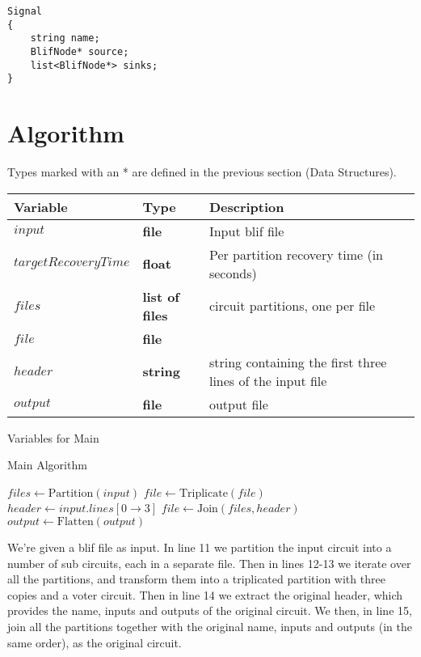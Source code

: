 \documentclass[12pt,draft,oneside]{article} %
\begin{document}
\begin{lstlisting}
Signal
{
    string name;
    BlifNode* source;
    list<BlifNode*> sinks;
}
\end{lstlisting}


\newpage
\section{Algorithm}
Types marked with an * are defined in the previous section (Data Structures).
\begin{algorithm}
    \begin{center}
        \begin{tabular}{lll}
        \toprule
        Variable & Type & Description\\
        \midrule
        $input$ & \bf{file} & Input blif file\\
        $targetRecoveryTime$ & \bf{float} & Per partition recovery time (in seconds) \\
        $files$ & \bf{list} of \bf{file}s & circuit partitions, one per file \\
        $file$ & \bf{file} & \\
        $header$ & \bf{string} & string containing the first three lines of the input file \\
        $output$ & \bf{file} & output file\\
        \bottomrule
        \end{tabular}
        \caption{Variables for Main}
        \label{varMain}
    \end{center}
   \caption{Main Algorithm}\label{main}
   \begin{algorithmic}[1]
         \State $files \gets \mbox{Partition}(input)$
            \State $file \gets \mbox{Triplicate}(file)$
         \EndFor
         \State $header \gets input.lines[0\to 3]$
         \State $file \gets \mbox{Join}(files, header)$
         \State $output \gets \mbox{Flatten}(output)$
      \EndProcedure
   \end{algorithmic}
\end{algorithm}
We're given a blif file as input.
In line 11 we partition the input circuit into a number of sub circuits, each in a separate file.
Then in lines 12-13 we iterate over all the partitions, and transform them into a triplicated partition with three copies and a voter circuit.
Then in line 14 we extract the original header, which provides the name, inputs and outputs of the original circuit.
We then, in line 15, join all the partitions together with the original name, inputs and outputs (in the same order), as the original circuit.
\newpage
\end{document}
